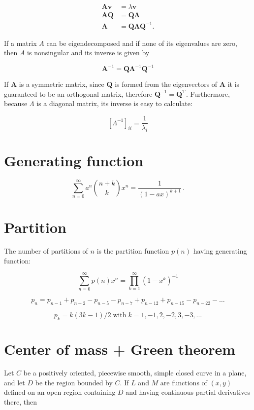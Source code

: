 \documentclass[11pt]{article}
\begin{document}
\begin{multicols}{3}
$$ {\begin{aligned}\mathbf {A} \mathbf {v} &=\lambda \mathbf {v} \\\mathbf {A} \mathbf {Q} &=\mathbf {Q} \mathbf {\Lambda } \\\mathbf {A} &=\mathbf {Q} \mathbf {\Lambda } \mathbf {Q} ^{-1}.\end{aligned}}$$

If a matrix $A$ can be eigendecomposed and if none of its eigenvalues are zero, then $A$ is nonsingular and its inverse is given by

$$\mathbf {A} ^{-1}=\mathbf {Q} \mathbf {\Lambda } ^{-1}\mathbf {Q} ^{-1}$$

If $\mathbf {A} $  is a symmetric matrix, since $ \mathbf {Q} $  is formed from the eigenvectors of $\mathbf {A}$  it is guaranteed to be an orthogonal matrix, therefore $\mathbf {Q} ^{-1}=\mathbf {Q} ^{\mathrm {T} }$. Furthermore, because $\Lambda$ is a diagonal matrix, its inverse is easy to calculate:

$$\left[\Lambda ^{-1}\right]_{ii}={\frac {1}{\lambda _{i}}}$$

\section{Generating function}

$$\sum _{n=0}^{\infty }a^{n}{\binom {n+k}{k}}x^{n}={\frac {1}{(1-ax)^{k+1}}}\,.$$

\section{Partition}
The number of partitions of $n$ is the partition function $p(n)$ having generating function:

$$\sum _{n=0}^{\infty }p(n)x^{n}=\prod _{k=1}^{\infty }(1-x^{k})^{-1}$$


$$p_n=p_{n - 1}+p_{n - 2}-p_{n - 5}-p_{n - 7}+p_{n - 12}+p_{n - 15}-p_{n - 22}- \dots$$

$$p_k = k(3k - 1) / 2 \;\text{with} \;k = 1, -1, 2, -2, 3, -3, \dots$$

\section{Center of mass + Green theorem}

Let $C$ be a positively oriented, piecewise smooth, simple closed curve in a plane, and let $D$ be the region bounded by $C$. If $L$ and $M$ are functions of $(x, y)$ defined on an open region containing $D$ and having continuous partial derivatives there, then


\end{multicols}
\end{document}
